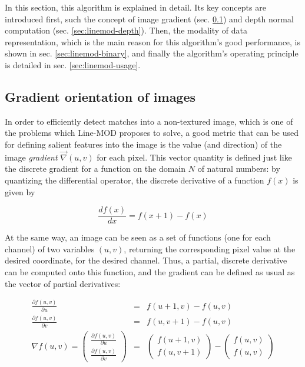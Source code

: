 In this section, this algorithm is explained in detail. Its key concepts are
introduced first, such the concept of image gradient (sec.
\ref{sec:linemod-gradient}) and depth normal computation (sec.
\ref{sec:linemod-depth}). Then, the modality of data representation, which is
the main reason for this algorithm's good performance, is shown in sec.
\ref{sec:linemod-binary}, and finally the algorithm's operating principle is
detailed in sec. \ref{sec:linemod-usage}.

\subsection{Gradient orientation of images} \label{sec:linemod-gradient}
In order to efficiently detect matches into a non-textured image, which is one
of the problems which Line-MOD proposes to solve, a good metric that can be
used for defining salient features into the image is the value (and direction)
of the image \emph{gradient} $\vec{\nabla} (u,v)$ for each pixel. This vector
quantity is defined just like the discrete gradient for a function on the
domain $N$ of natural numbers: by quantizing the differential operator, the
discrete derivative of a function $f(x)$ is given by

\begin{equation}
\frac{df(x)}{dx}=f(x+1)-f(x)
\end{equation}

At the same way, an image can be seen as a set of  functions (one for each
channel) of two variables $(u,v)$, returning the corresponding pixel value at
the desired coordinate, for the desired channel. Thus, a partial, discrete
derivative can be computed onto this function, and the gradient can be defined
as usual as the vector of partial derivatives:

\begin{eqnarray}
\frac{\partial f(u,v)}{\partial u} & = & f(u+1,v)-f(u,v) \\
\frac{\partial f(u,v)}{\partial v} & = & f(u,v+1)-f(u,v) \\
\nabla f(u,v) = \begin{pmatrix} \frac{\partial f(u,v)}{\partial u} \\
\frac{\partial f(u,v)}{\partial v} \end{pmatrix} & = &
\begin{pmatrix}f(u+1,v)\\ f(u,v+1)\end{pmatrix}-\begin{pmatrix}f(u,v) \\
f(u,v)\end{pmatrix}
\end{eqnarray}

